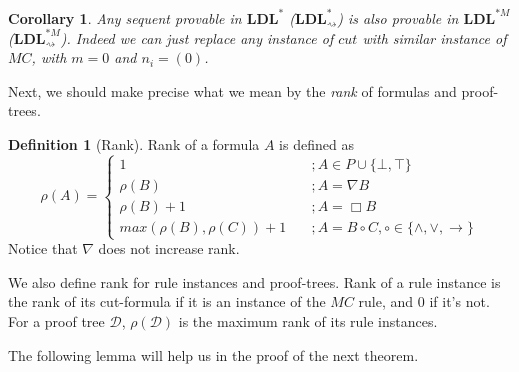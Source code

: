 \documentclass[12pt,a4paper]{article}
\theoremstyle{plain}
\newtheorem{cor}[thm]{Corollary}
\theoremstyle{definition}
\newtheorem{dfn}[thm]{Definition}
\begin{document}
\begin{cor}\label{cor:mc-riddance} Any sequent provable in $\mathbf{LDL}^*$ ($\mathbf{LDL}^*_{\rightsquigarrow}$) is also provable in $\mathbf{LDL}^{*M}$ ($\mathbf{LDL}^{*M}_{\rightsquigarrow}$). Indeed we can just replace any instance of $cut$ with similar instance of $MC$, with $m = 0$ and $n_i = (0)$.
\end{cor}

Next, we should make precise what we mean by the \emph{rank} of formulas and proof-trees.

\begin{dfn}[Rank]
	Rank of a formula $A$ is defined as
	\[ \rho(A) = \begin{cases}
	1 & \quad ; A \in P \cup \{ \bot, \top \} \\
	\rho(B) & \quad ; A = \nabla B \\
	\rho(B) + 1 & \quad ; A = \Box B \\
	max(\rho(B), \rho(C)) + 1 & \quad ; A = B \circ C, \circ \in \{ \land , \lor, \rightarrow \}
	\end{cases} \]
	Notice that $\nabla$ does not increase rank.
	
	We also define rank for rule instances and proof-trees. Rank of a rule instance is the rank of its cut-formula if it is an instance of the $MC$ rule, and $0$ if it's not.
	For a proof tree $\mathcal{D}$, $\rho(\mathcal{D})$ is the maximum rank of its rule instances.
\end{dfn}

The following lemma will help us in the proof of the next theorem.
\end{document}
